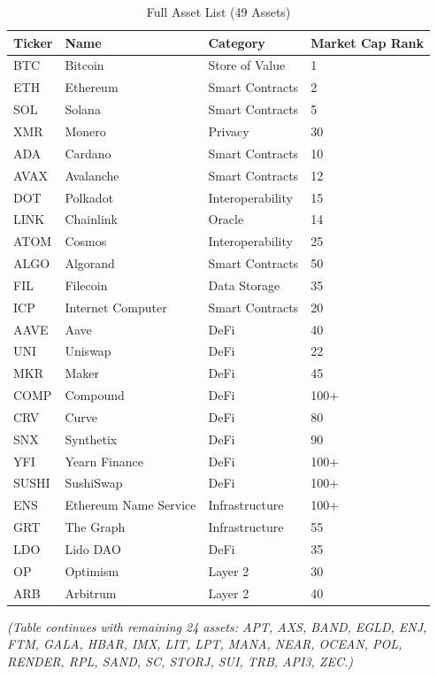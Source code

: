\documentclass[11pt,twocolumn]{article}
\begin{document}
\begin{table}[H]
\centering
\small
\caption{Full Asset List (49 Assets)}
\label{tab:full_assets}
\begin{tabular}{@{}llll@{}}
\toprule
\textbf{Ticker} & \textbf{Name} & \textbf{Category} & \textbf{Market Cap Rank} \\
\midrule
BTC & Bitcoin & Store of Value & 1 \\
ETH & Ethereum & Smart Contracts & 2 \\
SOL & Solana & Smart Contracts & 5 \\
XMR & Monero & Privacy & 30 \\
ADA & Cardano & Smart Contracts & 10 \\
AVAX & Avalanche & Smart Contracts & 12 \\
DOT & Polkadot & Interoperability & 15 \\
LINK & Chainlink & Oracle & 14 \\
ATOM & Cosmos & Interoperability & 25 \\
ALGO & Algorand & Smart Contracts & 50 \\
FIL & Filecoin & Data Storage & 35 \\
ICP & Internet Computer & Smart Contracts & 20 \\
AAVE & Aave & DeFi & 40 \\
UNI & Uniswap & DeFi & 22 \\
MKR & Maker & DeFi & 45 \\
COMP & Compound & DeFi & 100+ \\
CRV & Curve & DeFi & 80 \\
SNX & Synthetix & DeFi & 90 \\
YFI & Yearn Finance & DeFi & 100+ \\
SUSHI & SushiSwap & DeFi & 100+ \\
ENS & Ethereum Name Service & Infrastructure & 100+ \\
GRT & The Graph & Infrastructure & 55 \\
LDO & Lido DAO & DeFi & 35 \\
OP & Optimism & Layer 2 & 30 \\
ARB & Arbitrum & Layer 2 & 40 \\
\bottomrule
\end{tabular}
\end{table}

\textit{(Table continues with remaining 24 assets: APT, AXS, BAND, EGLD, ENJ, FTM, GALA, HBAR, IMX, LIT, LPT, MANA, NEAR, OCEAN, POL, RENDER, RPL, SAND, SC, STORJ, SUI, TRB, API3, ZEC.)}
\end{document}
